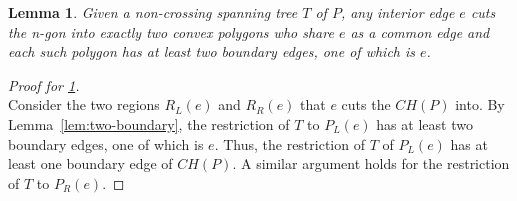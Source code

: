 \documentclass{article}
\newtheorem{lemma}[theorem]{Lemma}
\begin{document}
\begin{lemma}
	\label{lem:interior_edge_boundary}
	Given a non-crossing spanning tree $T$ of $P$, any interior edge $e$ cuts the n-gon into exactly two convex polygons who share $e$ as a common edge and each such polygon has at least two boundary edges, one of which is $e$.
\end{lemma}
\begin{proof}[Proof for \ref{lem:interior_edge_boundary}]
	$ $ \\
	Consider the two regions $R_L(e)$ and $R_R(e)$ that $e$ cuts the $CH(P)$ into. By Lemma~\ref{lem:two-boundary}, the restriction of $T$ to $P_L(e)$ has at least two boundary edges, one of which is $e$. Thus, the restriction of $T$ of $P_L(e)$ has at least one boundary edge of $CH(P)$. A similar argument holds for the restriction of $T$ to $P_R(e)$.
\end{proof}
\end{document}

